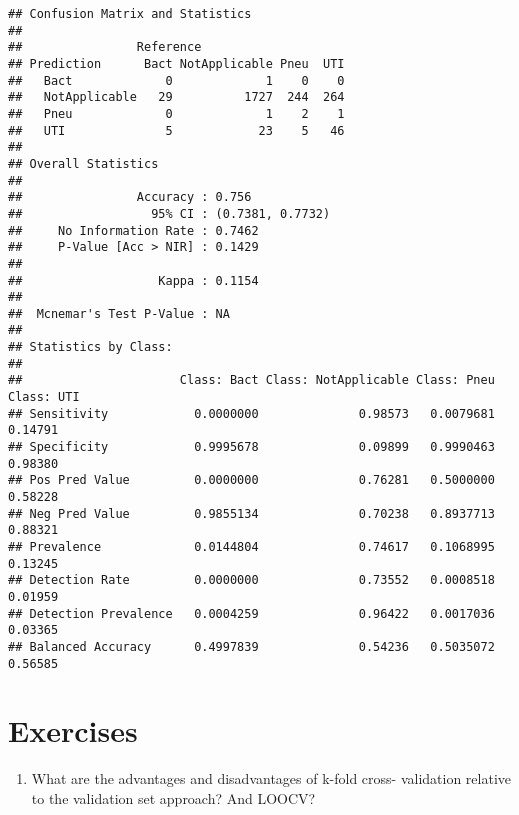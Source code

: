 \documentclass[
]{book}
\newenvironment{Shaded}{\begin{snugshade}}{\end{snugshade}}
\newcommand{\FunctionTok}[1]{\textcolor[rgb]{0.13,0.29,0.53}{\textbf{#1}}}
\newcommand{\NormalTok}[1]{#1}
\newcommand{\SpecialCharTok}[1]{\textcolor[rgb]{0.81,0.36,0.00}{\textbf{#1}}}
\providecommand{\tightlist}{%
  \setlength{\itemsep}{0pt}\setlength{\parskip}{0pt}}
\begin{document}
\begin{Shaded}
\end{Shaded}

\begin{verbatim}
## Confusion Matrix and Statistics
## 
##                Reference
## Prediction      Bact NotApplicable Pneu  UTI
##   Bact             0             1    0    0
##   NotApplicable   29          1727  244  264
##   Pneu             0             1    2    1
##   UTI              5            23    5   46
## 
## Overall Statistics
##                                           
##                Accuracy : 0.756           
##                  95% CI : (0.7381, 0.7732)
##     No Information Rate : 0.7462          
##     P-Value [Acc > NIR] : 0.1429          
##                                           
##                   Kappa : 0.1154          
##                                           
##  Mcnemar's Test P-Value : NA              
## 
## Statistics by Class:
## 
##                      Class: Bact Class: NotApplicable Class: Pneu Class: UTI
## Sensitivity            0.0000000              0.98573   0.0079681    0.14791
## Specificity            0.9995678              0.09899   0.9990463    0.98380
## Pos Pred Value         0.0000000              0.76281   0.5000000    0.58228
## Neg Pred Value         0.9855134              0.70238   0.8937713    0.88321
## Prevalence             0.0144804              0.74617   0.1068995    0.13245
## Detection Rate         0.0000000              0.73552   0.0008518    0.01959
## Detection Prevalence   0.0004259              0.96422   0.0017036    0.03365
## Balanced Accuracy      0.4997839              0.54236   0.5035072    0.56585
\end{verbatim}

\section{Exercises}\label{cv.exerc}

\begin{enumerate}
\def\labelenumi{\arabic{enumi})}
\tightlist
\item
  What are the advantages and disadvantages of k-fold cross-
  validation relative to the validation set approach? And LOOCV?
\end{enumerate}
\end{document}
